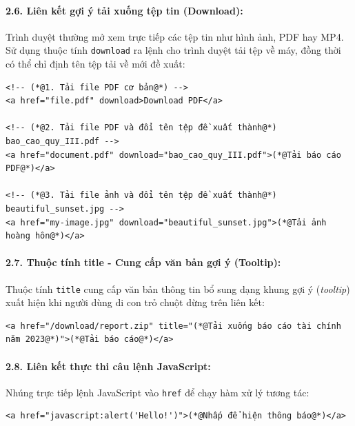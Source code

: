 \documentclass[11pt,oneside]{book}
\newcommand{\codeinline}[1]{\textcolor{accentOrange}{\texttt{#1}}}
\begin{document}
\paragraph{2.6. Liên kết gợi ý tải xuống tệp tin (Download):}
Trình duyệt thường mở xem trực tiếp các tệp tin như hình ảnh, PDF hay MP4. Sử dụng thuộc tính \codeinline{download} ra lệnh cho trình duyệt tải tệp về máy, đồng thời có thể chỉ định tên tệp tải về mới đề xuất:

\begin{codeWindow}
\begin{lstlisting}[language=HTML5]
<!-- (*@1. Tải file PDF cơ bản@*) -->
<a href="file.pdf" download>Download PDF</a>

<!-- (*@2. Tải file PDF và đổi tên tệp đề xuất thành@*) bao_cao_quy_III.pdf -->
<a href="document.pdf" download="bao_cao_quy_III.pdf">(*@Tải báo cáo PDF@*)</a>

<!-- (*@3. Tải file ảnh và đổi tên tệp đề xuất thành@*) beautiful_sunset.jpg -->
<a href="my-image.jpg" download="beautiful_sunset.jpg">(*@Tải ảnh hoàng hôn@*)</a>
\end{lstlisting}
\end{codeWindow}

\paragraph{2.7. Thuộc tính title - Cung cấp văn bản gợi ý (Tooltip):}
Thuộc tính \codeinline{title} cung cấp văn bản thông tin bổ sung dạng khung gợi ý (\textit{tooltip}) xuất hiện khi người dùng di con trỏ chuột dừng trên liên kết:

\begin{codeWindow}
\begin{lstlisting}[language=HTML5]
<a href="/download/report.zip" title="(*@Tải xuống báo cáo tài chính năm 2023@*)">(*@Tải báo cáo@*)</a>
\end{lstlisting}
\end{codeWindow}

\paragraph{2.8. Liên kết thực thi câu lệnh JavaScript:}
Nhúng trực tiếp lệnh JavaScript vào \codeinline{href} để chạy hàm xử lý tương tác:

\begin{codeWindow}
\begin{lstlisting}[language=HTML5]
<a href="javascript:alert('Hello!')">(*@Nhấp để hiện thông báo@*)</a>
\end{lstlisting}
\end{codeWindow}
\end{document}
